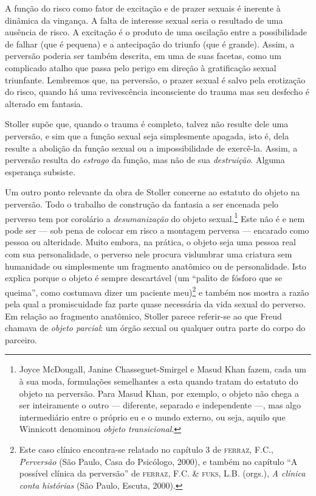 A função do risco como fator de excitação e de prazer sexuais é inerente à
dinâmica da vingança. A falta de interesse sexual seria o resultado de uma
ausência de risco. A excitação é o produto de uma oscilação entre a
possibilidade de falhar (que é pequena) e a antecipação do triunfo (que é
grande). Assim, a perversão poderia ser também descrita, em uma de suas
facetas, como um complicado atalho que passa pelo perigo em direção à
gratificação sexual triunfante. Lembremos que, na perversão, o prazer
sexual é salvo pela erotização do risco, quando há uma revivescência
inconsciente do trauma mas seu desfecho é alterado em fantasia.

Stoller supõe que, quando o trauma é completo, talvez não resulte dele uma
perversão, e sim que a função sexual seja simplesmente apagada, isto é, dela
resulte a abolição da função sexual ou a impossibilidade de exercê-la.
Assim, a perversão resulta do \textit{estrago} da função, mas não de sua
\textit{destruição}. Alguma esperança subsiste.

Um outro ponto relevante da obra de Stoller concerne ao estatuto do objeto
na perversão. Todo o trabalho de construção da fantasia a ser encenada pelo
perverso tem por corolário a \textit{desumanização} do objeto
sexual.\footnote{ Joyce McDougall, Janine Chasseguet-Smirgel e Masud Khan
fazem, cada um à sua moda, formulações semelhantes a esta quando tratam do
estatuto do objeto na perversão. Para Masud Khan, por exemplo, o objeto não
chega a ser inteiramente o outro --- diferente, separado e independente ---,
mas algo intermediário entre o próprio eu e o mundo externo, ou seja,
aquilo que Winnicott denominou \textit{objeto transicional}.} Este não é e
nem pode ser --- sob pena de colocar em risco a montagem perversa --- encarado
como pessoa ou alteridade. Muito embora, na prática, o objeto seja uma
pessoa real com sua personalidade, o perverso nele procura vislumbrar uma
criatura sem humanidade ou simplesmente um fragmento anatômico ou de
personalidade. Isto explica porque o objeto é sempre descartável (um
“palito de fósforo que se queima”, como costumava dizer um paciente
meu)\footnote{ Este caso clínico encontra-se relatado no capítulo 3 de
\textsc{ferraz}, F.C., \textit{Perversão} (São Paulo, Casa do Psicólogo, 2000), e
também no capítulo “A possível clínica da perversão” de \textsc{ferraz}, F.C. \&
\textsc{fuks}, L.B. (orgs.), \textit{A clínica conta histórias} (São Paulo, Escuta,
2000).} e também nos mostra a razão pela qual a promiscuidade faz parte
quase necessária da vida sexual do perverso. Em relação ao fragmento
anatômico, Stoller parece referir-se ao que Freud chamava de \textit{objeto
parcial}: um órgão sexual ou qualquer outra parte do corpo do parceiro.

